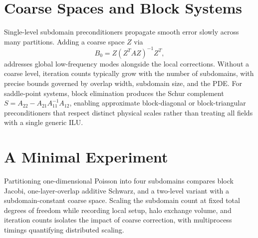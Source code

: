 \section{Coarse Spaces and Block Systems}
Single-level subdomain preconditioners propagate smooth error slowly across many partitions. Adding a coarse space $Z$ via
\[
 B_0=Z(Z^TAZ)^{-1}Z^T,
\]
addresses global low-frequency modes alongside the local corrections. Without a coarse level, iteration counts typically grow with the number of subdomains, with precise bounds governed by overlap width, subdomain size, and the PDE.
For saddle-point systems, block elimination produces the Schur complement
$S=A_{22}-A_{21}A_{11}^{-1}A_{12}$, enabling approximate block-diagonal or block-triangular preconditioners that respect distinct physical scales rather than treating all fields with a single generic ILU.
\section{A Minimal Experiment}
Partitioning one-dimensional Poisson into four subdomains compares block Jacobi, one-layer-overlap additive Schwarz, and a two-level variant with a subdomain-constant coarse space. Scaling the subdomain count at fixed total degrees of freedom while recording local setup, halo exchange volume, and iteration counts isolates the impact of coarse correction, with multiprocess timings quantifying distributed scaling.
